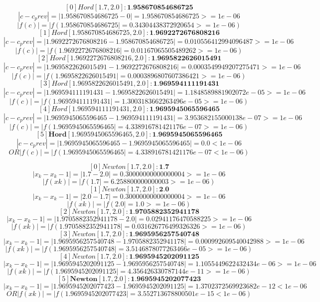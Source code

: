 \documentclass{article}
\begin{document}
    $$ [0] Hord [1.7, 2.0]: \textbf{1.958670854686725} $$ $$ |c - c_prev| = |1.958670854686725 - 0| = 1.958670854686725 >= 1e-06 $$ $$ |f(c)| = |f(1.958670854686725| = 0.34304438372920654 >= 1e-06) $$
    $$ [1] Hord [1.958670854686725, 2.0]: \textbf{1.9692272676808216} $$ $$ |c - c_prev| = |1.9692272676808216 - 1.958670854686725| = 0.010556412994096487 >= 1e-06 $$ $$ |f(c)| = |f(1.9692272676808216| = 0.01167065505489262 >= 1e-06) $$
    $$ [2] Hord [1.9692272676808216, 2.0]: \textbf{1.9695822626015491} $$ $$ |c - c_prev| = |1.9695822626015491 - 1.9692272676808216| = 0.0003549949207275471 >= 1e-06 $$ $$ |f(c)| = |f(1.9695822626015491| = 0.0003896807607386421 >= 1e-06) $$
    $$ [3] Hord [1.9695822626015491, 2.0]: \textbf{1.969594111191431} $$ $$ |c - c_prev| = |1.969594111191431 - 1.9695822626015491| = 1.1848589881902072e-05 >= 1e-06 $$ $$ |f(c)| = |f(1.969594111191431| = 1.3003183662263496e-05 >= 1e-06) $$
    $$ [4] Hord [1.969594111191431, 2.0]: \textbf{1.9695945065596465} $$ $$ |c - c_prev| = |1.9695945065596465 - 1.969594111191431| = 3.953682155000138e-07 >= 1e-06 $$ $$ |f(c)| = |f(1.9695945065596465| = 4.338916781421176e-07 >= 1e-06) $$
    $$ [5] \textbf{Hord} [1.9695945065596465, 2.0]: \textbf{1.9695945065596465} $$ $$ |c - c_prev| = |1.9695945065596465 - 1.9695945065596465| = 0.0 < 1e-06 $$ $$ OR |f(c)| = |f(1.9695945065596465| = 4.338916781421176e-07 < 1e-06) $$


    $$ [0] Newton [1.7, 2.0]: \textbf{1.7} $$ $$ |x_k - x_k-1| = |1.7 - 2.0| = 0.30000000000000004 >= 1e-06 $$ $$ |f(xk)| = |f(1.7| = 6.258800000000003 >= 1e-06) $$
    $$ [1] Newton [1.7, 2.0]: \textbf{2.0} $$ $$ |x_k - x_k-1| = |2.0 - 1.7| = 0.30000000000000004 >= 1e-06 $$ $$ |f(xk)| = |f(2.0| = 1.0 >= 1e-06) $$
    $$ [2] Newton [1.7, 2.0]: \textbf{1.9705882352941178} $$ $$ |x_k - x_k-1| = |1.9705882352941178 - 2.0| = 0.02941176470588225 >= 1e-06 $$ $$ |f(xk)| = |f(1.9705882352941178| = 0.031626776499326326 >= 1e-06) $$
    $$ [3] Newton [1.7, 2.0]: \textbf{1.9695956257540748} $$ $$ |x_k - x_k-1| = |1.9695956257540748 - 1.9705882352941178| = 0.000992609540042988 >= 1e-06 $$ $$ |f(xk)| = |f(1.9695956257540748| = 3.5146878077263466e-05 >= 1e-06) $$
    $$ [4] Newton [1.7, 2.0]: \textbf{1.9695945202091125} $$ $$ |x_k - x_k-1| = |1.9695945202091125 - 1.9695956257540748| = 1.1055449622432434e-06 >= 1e-06 $$ $$ |f(xk)| = |f(1.9695945202091125| = 4.356426330787144e-11 >= 1e-06) $$
    $$ [5] \textbf{Newton} [1.7, 2.0]: \textbf{1.9695945202077423} $$ $$ |x_k - x_k-1| = |1.9695945202077423 - 1.9695945202091125| = 1.3702372569923682e-12 < 1e-06 $$ $$ OR |f(xk)| = |f(1.9695945202077423| = 3.552713678800501e-15 < 1e-06)     $$
\end{document}
